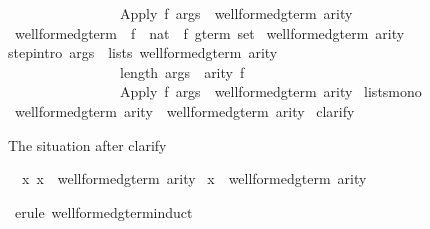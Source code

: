 \begin{isabellebody}
\ \ \ \ \ \ \ \ \ \ \ \ \ \ \ {\isasymLongrightarrow}\ {\isacharparenleft}Apply\ f\ args{\isacharparenright}\ {\isasymin}\ well{\isacharunderscore}formed{\isacharunderscore}gterm\ arity{\isachardoublequote}\isanewline
\isanewline
\isanewline
\isamarkupfalse%
\ well{\isacharunderscore}formed{\isacharunderscore}gterm{\isacharprime}\ {\isacharcolon}{\isacharcolon}\ {\isachardoublequote}{\isacharparenleft}{\isacharprime}f\ {\isasymRightarrow}\ nat{\isacharparenright}\ {\isasymRightarrow}\ {\isacharprime}f\ gterm\ set{\isachardoublequote}\isanewline
\isamarkupfalse%
\ {\isachardoublequote}well{\isacharunderscore}formed{\isacharunderscore}gterm{\isacharprime}\ arity{\isachardoublequote}\isanewline
{}\isanewline
step{\isacharbrackleft}intro{\isacharbang}{\isacharbrackright}{\isacharcolon}\ {\isachardoublequote}{\isasymlbrakk}args\ {\isasymin}\ lists\ {\isacharparenleft}well{\isacharunderscore}formed{\isacharunderscore}gterm{\isacharprime}\ arity{\isacharparenright}{\isacharsemicolon}\ \ \isanewline
\ \ \ \ \ \ \ \ \ \ \ \ \ \ \ \ length\ args\ {\isacharequal}\ arity\ f{\isasymrbrakk}\isanewline
\ \ \ \ \ \ \ \ \ \ \ \ \ \ \ {\isasymLongrightarrow}\ {\isacharparenleft}Apply\ f\ args{\isacharparenright}\ {\isasymin}\ well{\isacharunderscore}formed{\isacharunderscore}gterm{\isacharprime}\ arity{\isachardoublequote}\isanewline
{}\ lists{\isacharunderscore}mono\isanewline
\isanewline
\isamarkupfalse%
\ {\isachardoublequote}well{\isacharunderscore}formed{\isacharunderscore}gterm\ arity\ {\isasymsubseteq}\ well{\isacharunderscore}formed{\isacharunderscore}gterm{\isacharprime}\ arity{\isachardoublequote}\isanewline
%
\isadelimproof
%
\endisadelimproof
%
\isatagproof
\isamarkupfalse%
\ clarify\isamarkuptrue%
%
\begin{isamarkuptxt}%
The situation after clarify
\begin{isabelle}%
\ {}{\isachardot}\ {\isasymAnd}x{\isachardot}\ x\ {\isasymin}\ well{\isacharunderscore}formed{\isacharunderscore}gterm\ arity\ {\isasymLongrightarrow}\isanewline
{}x\ {\isasymin}\ well{\isacharunderscore}formed{\isacharunderscore}gterm{\isacharprime}\ arity%
\end{isabelle}%
\end{isamarkuptxt}%
\isamarkupfalse%
\ {\isacharparenleft}erule\ well{\isacharunderscore}formed{\isacharunderscore}gterm{\isachardot}induct{\isacharparenright}\isamarkuptrue%

\end{isabellebody}
